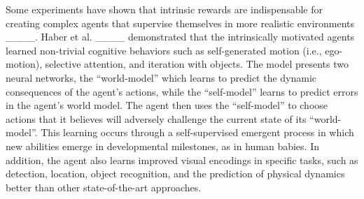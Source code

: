 

Some experiments have shown that intrinsic rewards are indispensable for creating complex agents that supervise themselves in more realistic environments ____. Haber et al. ____ demonstrated that the intrinsically motivated agents learned non-trivial cognitive behaviors such as self-generated motion (i.e., ego-motion), selective attention, and iteration with objects. The model presents two neural networks, the ``world-model'' which learns to predict the dynamic consequences of the agent's actions, while the ``self-model'' learns to predict errors in the agent's world model. The agent then uses the ``self-model'' to choose actions that it believes will adversely challenge the current state of its ``world-model''. This learning occurs through a self-supervised emergent process in which new abilities emerge in developmental milestones, as in human babies. In addition, the agent also learns improved visual encodings in specific tasks, such as detection, location, object recognition, and the prediction of physical dynamics better than other state-of-the-art approaches.



